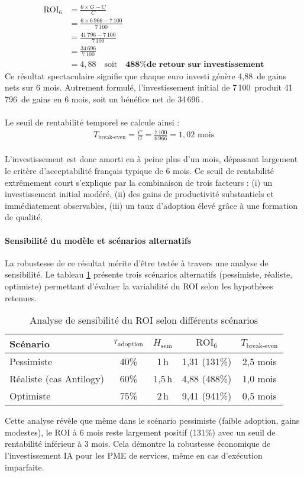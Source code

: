 \begin{align}
\text{ROI}_6 &= \frac{6 \times G - C}{C} \\
&= \frac{6 \times 6\,966 - 7\,100}{7\,100} \\
&= \frac{41\,796 - 7\,100}{7\,100} \\
&= \frac{34\,696}{7\,100} \\
&= 4{,}88 \quad \text{soit} \quad \textbf{488\% de retour sur investissement}
\end{align}
\medskip
Ce résultat spectaculaire signifie que chaque euro investi génère 4,88\,\texteuro{} de gains nets sur 6 mois. Autrement formulé, l'investissement initial de 7\,100\,\texteuro{} produit 41\,796\,\texteuro{} de gains en 6 mois, soit un bénéfice net de 34\,696\,\texteuro{}.
\\\\
Le seuil de rentabilité temporel se calcule ainsi :
\begin{align}
T_{\text{break-even}} = \frac{C}{G} = \frac{7\,100}{6\,966} = 1{,}02 \text{ mois}
\end{align}
\\
L'investissement est donc amorti en à peine plus d'un mois, dépassant largement le critère d'acceptabilité français typique de 6 mois. Ce seuil de rentabilité extrêmement court s'explique par la combinaison de trois facteurs : (i) un investissement initial modéré, (ii) des gains de productivité substantiels et immédiatement observables, (iii) un taux d'adoption élevé grâce à une formation de qualité.

\paragraph{Sensibilité du modèle et scénarios alternatifs}

La robustesse de ce résultat mérite d'être testée à travers une analyse de sensibilité. Le tableau \ref{tab:roi_sensitivity} présente trois scénarios alternatifs (pessimiste, réaliste, optimiste) permettant d'évaluer la variabilité du ROI selon les hypothèses retenues.

\begin{table}[ht]
\centering
\caption{Analyse de sensibilité du ROI selon différents scénarios}
\label{tab:roi_sensitivity}
\begin{tabular}{@{}lcccc@{}}
\toprule
\textbf{Scénario} & \textbf{$\tau_{\text{adoption}}$} & \textbf{$H_{\text{sem}}$} & \textbf{$\text{ROI}_6$} & \textbf{$T_{\text{break-even}}$} \\
\midrule
Pessimiste & 40\% & 1\,h & 1{,}31 (131\%) & 2{,}5 mois \\
Réaliste (cas Antilogy) & 60\% & 1{,}5\,h & 4{,}88 (488\%) & 1{,}0 mois \\
Optimiste & 75\% & 2\,h & 9{,}41 (941\%) & 0{,}5 mois \\
\bottomrule
\end{tabular}
\end{table}
\medskip
Cette analyse révèle que même dans le scénario pessimiste (faible adoption, gains modestes), le ROI à 6 mois reste largement positif (131\%) avec un seuil de rentabilité inférieur à 3 mois. Cela démontre la robustesse économique de l'investissement IA pour les PME de services, même en cas d'exécution imparfaite.

